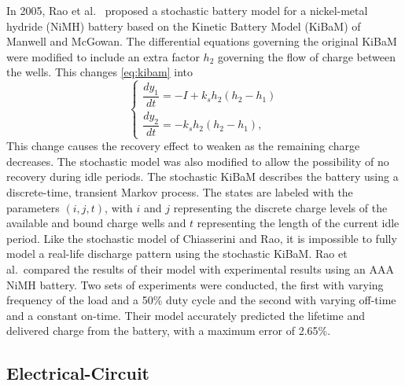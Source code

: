 \documentclass[../zhang_thesis.tex]{subfiles}
\begin{document}
In 2005, Rao et al.~\cite{rao05} proposed a stochastic battery model for a nickel-metal hydride (NiMH) battery based on the Kinetic Battery Model (KiBaM) of Manwell and McGowan. The differential equations governing the original KiBaM were modified to include an extra factor $h_2$ governing the flow of charge between the wells. This changes \cref{eq:kibam} into
\begin{equation}
    \begin{cases}
        \dfrac{dy_1}{dt} = -I + k_s h_2 \left( h_2 - h_1 \right) \\
        \dfrac{dy_2}{dt} = -k_s h_2 \left( h_2 - h_1 \right),
    \end{cases}
\end{equation}
This change causes the recovery effect to weaken as the remaining charge decreases. The stochastic model was also modified to allow the possibility of no recovery during idle periods. The stochastic KiBaM describes the battery using a discrete-time, transient Markov process. The states are labeled with the parameters $(i,j,t)$, with $i$ and $j$ representing the discrete charge levels of the available and bound charge wells and $t$ representing the length of the current idle period.
Like the stochastic model of Chiasserini and Rao, it is impossible to fully model a real-life discharge pattern using the stochastic KiBaM. Rao et al.\ compared the results of their model with experimental results using an AAA NiMH battery. Two sets of experiments were conducted, the first with varying frequency of the load and a 50\% duty cycle and the second with varying off-time and a constant on-time. Their model accurately predicted the lifetime and delivered charge from the
battery, with a maximum error of 2.65\%.

\subsection{Electrical-Circuit}
\end{document}
